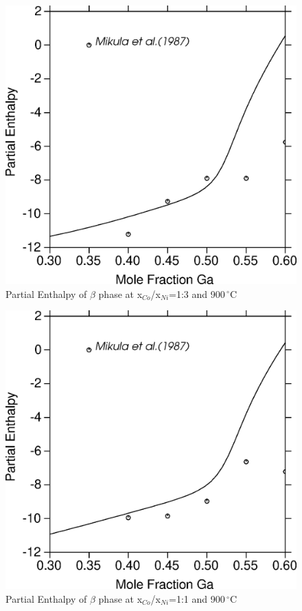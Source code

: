 \documentclass[article]{elsarticle}
\begin{document}
\begin{figure}
\centering
\includegraphics[scale=0.45]{hmr_beta_Co25}
\caption{Partial Enthalpy of $\beta$ phase at x$_{Co}$/x$_{Ni}$=1:3 and 900$\,^{\circ}\mathrm{C}$}
\label{hmr_co25}
\end{figure}
\begin{figure}
\centering
\includegraphics[scale=0.45]{hmr_beta_Co50}
\caption{Partial Enthalpy of $\beta$ phase at x$_{Co}$/x$_{Ni}$=1:1 and 900$\,^{\circ}\mathrm{C}$}
\label{hmr_co50}
\end{figure}
\end{document}
